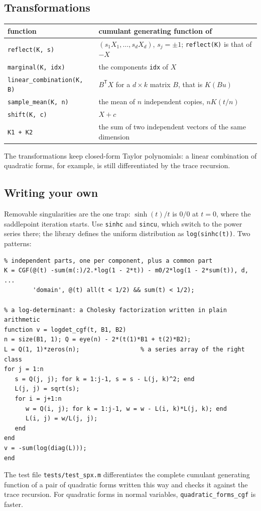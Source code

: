 \documentclass[11pt]{article}
\newcommand{\prog}[1]{\texttt{#1}}
\newcommand{\tp}{^{\mathsf T}}
\begin{document}
\subsection{Transformations}

\begin{longtable}{@{}>{\raggedright\arraybackslash}p{}>{\raggedright\arraybackslash}p{}@{}}
\toprule
function & cumulant generating function of\\
\midrule
\endhead
\prog{reflect(K, s)} & $(s_1X_1,\ldots,s_dX_d)$, $s_j=\pm1$; \prog{reflect(K)} is that of $-X$\\
\prog{marginal(K, idx)} & the components \prog{idx} of $X$\\
\prog{linear\_combination(K, B)} & $B\tp X$ for a $d\times k$ matrix $B$, that is $K(Bu)$\\
\prog{sample\_mean(K, n)} & the mean of $n$ independent copies, $nK(t/n)$\\
\prog{shift(K, c)} & $X+c$\\
\prog{K1 + K2} & the sum of two independent vectors of the same dimension\\
\bottomrule
\end{longtable}

\noindent The transformations keep closed-form Taylor polynomials: a linear combination of
quadratic forms, for example, is still differentiated by the trace recursion.

\subsection{Writing your own}\label{sec:own}

Removable singularities are the one trap: $\sinh(t)/t$ is $0/0$ at $t=0$, where the saddlepoint
iteration starts. Use \prog{sinhc} and \prog{sincu}, which switch to the power series there; the
library defines the uniform distribution as \prog{log(sinhc(t))}. Two patterns:
\begin{lstlisting}
% independent parts, one per component, plus a common part
K = CGF(@(t) -sum(m(:)/2.*log(1 - 2*t)) - m0/2*log(1 - 2*sum(t)), d, ...
        'domain', @(t) all(t < 1/2) && sum(t) < 1/2);

% a log-determinant: a Cholesky factorization written in plain arithmetic
function v = logdet_cgf(t, B1, B2)
n = size(B1, 1); Q = eye(n) - 2*(t(1)*B1 + t(2)*B2);
L = Q(1, 1)*zeros(n);                 % a series array of the right class
for j = 1:n
   s = Q(j, j); for k = 1:j-1, s = s - L(j, k)^2; end
   L(j, j) = sqrt(s);
   for i = j+1:n
      w = Q(i, j); for k = 1:j-1, w = w - L(i, k)*L(j, k); end
      L(i, j) = w/L(j, j);
   end
end
v = -sum(log(diag(L)));
end
\end{lstlisting}
The test file \prog{tests/test\_spx.m} differentiates the complete cumulant generating function of a
pair of quadratic forms written this way and checks it against the trace recursion. For quadratic
forms in normal variables, \prog{quadratic\_forms\_cgf} is faster.
\end{document}
